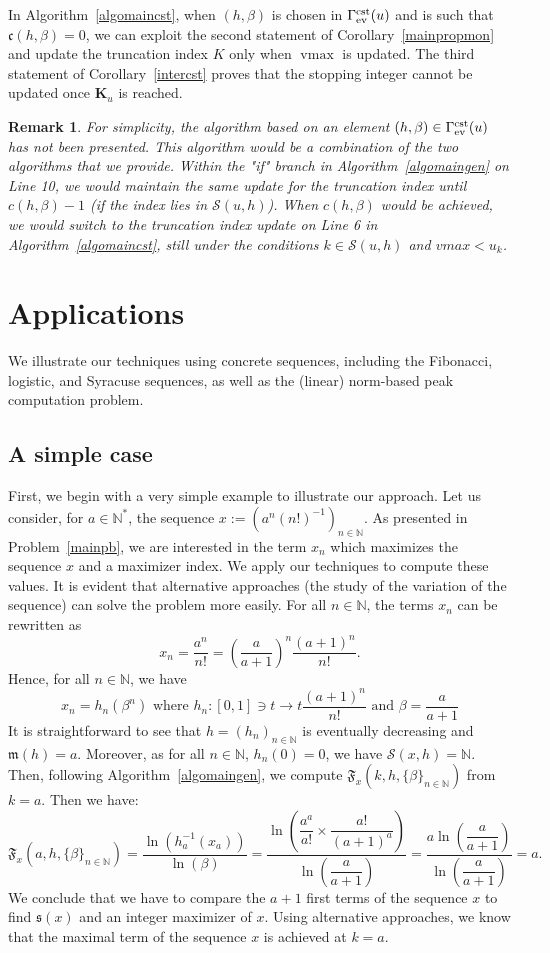 \documentclass{article}
\def\valu#1{\mathfrak{s}(#1)}
\def\funset{\Gamma}
\def\fcste{\funset_{{\rm ev}}^{\rm cst}}
\def\mon{\mathfrak{m}}
\def\cst{\mathfrak{c}}
\def\nn{\mathbb N}
\def\vmax{\operatorname{vmax}}
\def\bigkse{\mathbf{K}}
\def\res{\mathcal{S}}
\newtheorem{remark}{Remark}
\def\red#1{#1}
\def\blue#1{#1}
\begin{document}
		In Algorithm~\ref{algomaincst}, when $(h,\beta)$ is chosen in $\fcste(u)$ and is such that $\cst(h,\beta)=0$, we can exploit the second statement of Corollary~\ref{mainpropmon} and update the truncation index $K$ only when $\vmax$ is updated. The third statement of \blue{Corollary~\ref{intercst}} proves that the stopping integer cannot be updated once $\bigkse_u$ \red{is reached}.
		
\blue{		
\begin{remark}
For simplicity, the algorithm based on an element $(h,\beta)\in\fcste(u)$ has not been presented. This algorithm would be a combination of the two algorithms that we provide. Within the "if" branch in Algorithm~\ref{algomaingen} on Line 10, we would maintain the same update for the truncation index until $c(h,\beta)-1$ (if the index lies in $\res(u,h)$). When $c(h,\beta)$ would be achieved, we would switch to the truncation index update on Line 6 in Algorithm~\ref{algomaincst}, still under the conditions $k\in \res(u,h)$ and $vmax<u_k$. 
\end{remark}		
}
		\section{Applications}
		\label{applis}

\blue{
We illustrate our techniques using concrete sequences, including the Fibonacci, logistic, and Syracuse sequences, as well as the (linear) norm-based peak computation problem.   
}		
		
		\subsection{A simple case}
		\red{First, we begin} with a very simple example to illustrate our approach. Let us consider, for $a\in\nn^*$, the sequence $x:=(a^n (n!)^{-1})_{n\in\nn}$. As presented in Problem~\ref{mainpb}, we are interested in the term $x_n$ which maximizes the sequence $x$ and \red{a} maximizer index. We apply our techniques to compute \red{these values}. It is evident that alternative approaches (the study of the variation of the sequence) can solve the problem \red{more easily}. For all $n\in\nn$, the terms $x_n$ \red{can be rewritten as}
		\[
		x_n=\dfrac{a^n}{n!}=\left(\dfrac{a}{a+1}\right)^n\dfrac{(a+1)^{n}}{n!}.
		\]
		Hence, for all $n\in\nn$, \red{we have}
		\[
		x_n=h_n(\beta^n)\text{ where } h_n:[0,1]\ni t\to t\dfrac{(a+1)^n}{n!} \text{ and }\beta=\dfrac{a}{a+1}
		\]
		It is straightforward to see that $h=(h_n)_{n\in\nn}$ is eventually decreasing and $\mon(h)=a$. Moreover, as for all $n\in\nn$, $h_n(0)=0$, we have $\res(x,h)=\nn$. Then, following Algorithm~\ref{algomaingen}, we compute $\mathfrak{F}_x(k,h,\{\beta\}_{n\in\nn})$ from $k=a$. Then we have:
		\[
		\mathfrak{F}_x(a,h,\{\beta\}_{n\in\nn})=\dfrac{\ln\left(h_a^{-1}(x_a)\right)}{\ln(\beta)}=\dfrac{\ln\left(\dfrac{a^a}{a!}\times \dfrac{a!}{(a+1)^a}\right)}{\ln\left(\dfrac{a}{a+1}\right)}=
		\dfrac{a\ln\left(\dfrac{a}{a+1}\right)}{\ln\left(\dfrac{a}{a+1}\right)}=a.
		\]
		We conclude that we have to compare the $a+1$ first terms of the sequence $x$ to find $\valu{x}$ and \red{an} integer maximizer of $x$. Using alternative approaches, we know that the maximal term of the sequence $x$ is \red{achieved} at $k=a$.
		
\end{document}
